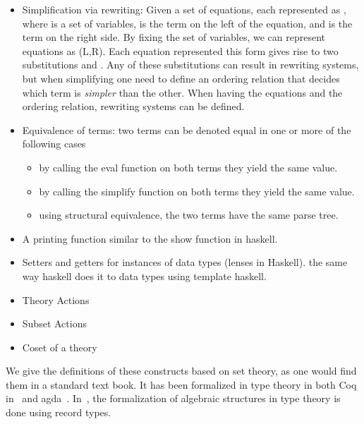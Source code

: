 \begin{itemize}
\begin{itemize}
    \end{itemize}      
    \item Simplification via rewriting: Given a set of equations, each represented as , where  is a set of variables,  is the term on the left of the equation, and  is the term on the right side. By fixing the set of variables, we can represent equations as  (L,R). Each equation represented this form gives rise to two substitutions  and . Any of these substitutions can result in rewriting systems, but when simplifying one need to define an ordering relation that decides which term is \emph{simpler} than the other. When having the equations and the ordering relation, rewriting systems can be defined. 
    \item Equivalence of terms: two terms can be denoted equal in one or more of the following cases 
    \begin{itemize}
        \item by calling the eval function on both terms they yield the same value.  
        \item by calling the simplify function on both terms they yield the same value. 
        \item using structural equivalence, the two terms have the same parse tree. 
    \end{itemize}
    \item A printing function similar to the show function in haskell. 
    \item Setters and getters for instances of data types (lenses in Haskell). the same way haskell does it to data types using template haskell. 
    \item Theory Actions 
    \item Subset Actions
    \item Coset of a theory 
\end{itemize}
We give the definitions of these constructs based on set theory, as one would find them in a standard text book. It has been formalized in type theory in  both Coq in~\cite{capretta99, Spitters2010} and agda~\cite{Gunther2018Agda}. In~\cite{capretta99}, the formalization of algebraic structures in type theory is done using record types. 

